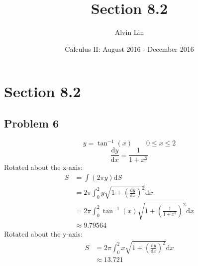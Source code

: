 \documentclass[letterpaper, 12pt]{article}
\title{Section 8.2}
\author{Alvin Lin}
\date{Calculus II: August 2016 - December 2016}
\renewcommand*{\arctan}{\tan^{-1}}
\newcommand*{\diff}{\mathrm{d}}
\begin{document}
\maketitle

\section*{Section 8.2}

\subsection*{Problem 6}
\[ y = \arctan(x) \quad \quad 0 \leq x \leq 2 \]
\[ \frac{\diff{y}}{\diff{x}} = \frac{1}{1+x^{2}} \]
Rotated about the x-axis:
\begin{align*}
  S &= \int{(2\pi y)\diff{S}} \\
  &= 2\pi\int_{0}^{2}{y\sqrt{1+(\frac{\diff{y}}{\diff{x}})^{2}}\diff{x}} \\
  &= 2\pi\int_{0}^{2}{\arctan(x)\sqrt{1+(\frac{1}{1+x^{2}})^{2}}\diff{x}} \\
  & \approx 9.79564
\end{align*}
Rotated about the y-axis:
\begin{align*}
  S &= 2\pi\int_{0}^{2}{x\sqrt{1+(\frac{\diff{y}}{\diff{x}})^{2}}\diff{x}} \\
  & \approx 13.721
\end{align*}
\end{document}

